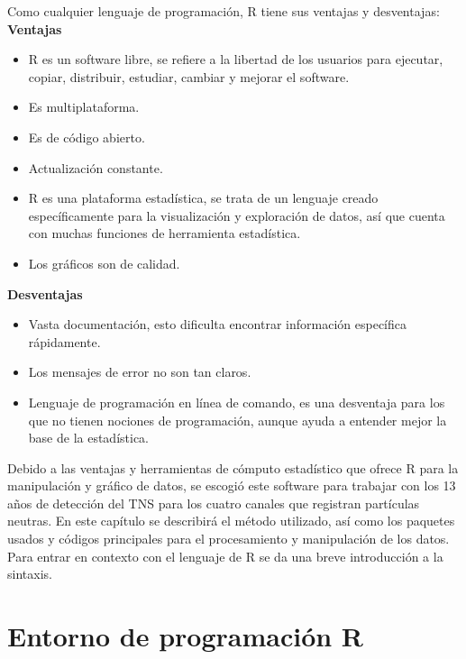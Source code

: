 Como cualquier lenguaje de programación, R tiene sus ventajas y desventajas:\\

\textbf{Ventajas}

\begin{itemize}
\item R es un software libre, se refiere a la libertad
de los usuarios para ejecutar, copiar, distribuir, estudiar, cambiar y mejorar el software.

\item Es multiplataforma.
\item Es de código abierto.
\item Actualización constante.
\item R es una plataforma estadística, se trata de un lenguaje creado específicamente para la visualización y exploración de datos, así que cuenta con muchas funciones de herramienta estadística.
\item Los gráficos son de calidad.
\end{itemize}


\textbf{Desventajas}

\begin{itemize}
\item Vasta documentación, esto dificulta encontrar información específica rápidamente.
\item Los mensajes de error no son tan claros.
\item Lenguaje de programación en línea de comando, es una desventaja para los que no tienen nociones de programación, aunque ayuda a entender mejor la base de la estadística.
\end{itemize}

Debido a las ventajas y herramientas de cómputo estadístico que ofrece R para la manipulación y gráfico de datos, se escogió este software para trabajar con los 13 años de detección del TNS para los cuatro canales que registran partículas neutras. En este capítulo se describirá el método utilizado, así como los paquetes usados y códigos principales para el procesamiento y manipulación de los datos. Para entrar en contexto con el lenguaje de R se da una breve introducción a la sintaxis. 

\section{Entorno de programación R}

